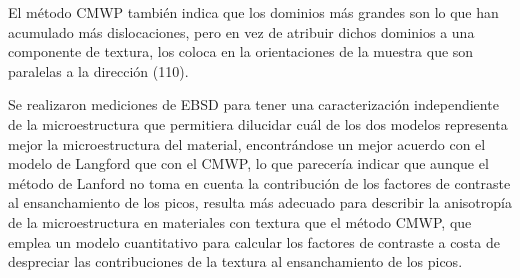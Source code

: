 El método CMWP también indica que los dominios más grandes son lo que han acumulado más dislocaciones, pero en vez de atribuir dichos dominios a una componente de textura, los coloca en la orientaciones de la muestra que son paralelas a la dirección (110).

Se realizaron mediciones de EBSD para tener una caracterización independiente de la microestructura que permitiera dilucidar cuál de los dos modelos representa mejor la microestructura del material, encontrándose un mejor acuerdo con el modelo de Langford que con el CMWP, lo que parecería indicar que aunque el método de Lanford no toma en cuenta la contribución de los factores de contraste al ensanchamiento de los picos, resulta más adecuado para describir la anisotropía de la microestructura en materiales con textura que el método CMWP, que emplea un modelo cuantitativo para calcular los factores de contraste a costa de despreciar las contribuciones de la textura al ensanchamiento de los picos.

